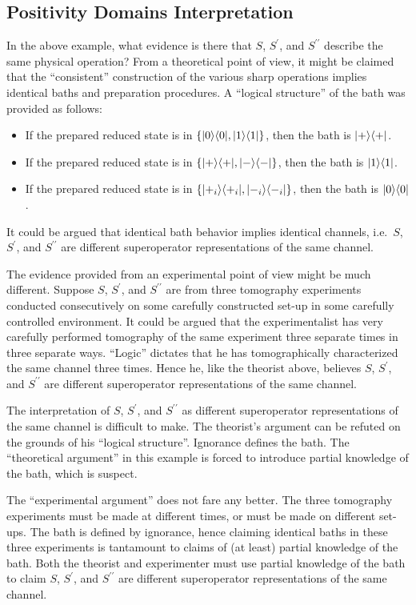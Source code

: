 \subsection{Positivity Domains Interpretation}
In the above example, what evidence is there that $S$, $S^\prime$, and $S^{\prime\prime}$ describe the same physical operation?  From a theoretical point of view, it might be claimed that the ``consistent'' construction of the various sharp operations implies identical baths and preparation procedures.  A ``logical structure'' of the bath was provided as follows:
\begin{itemize}
\item If the prepared reduced state is in $\{|0\rangle\langle0|,|1\rangle\langle1|\}$, then the bath is $|+\rangle\langle+|$.
\item If the prepared reduced state is in $\{|+\rangle\langle+|,|-\rangle\langle-|\}$, then the bath is $|1\rangle\langle1|$.
\item If the prepared reduced state is in $\{|+_i\rangle\langle+_i|,|-_i\rangle\langle-_i|\}$, then the bath is $|0\rangle\langle0|$.
\end{itemize}
It could be argued that identical bath behavior implies identical channels, i.e.\ $S$, $S^\prime$, and $S^{\prime\prime}$ are different superoperator representations of the same channel. 

The evidence provided from an experimental point of view might be much different.  Suppose $S$, $S^\prime$, and $S^{\prime\prime}$ are from three tomography experiments conducted consecutively on some carefully constructed set-up in some carefully controlled environment.  It could be argued that the experimentalist has very carefully performed tomography of the same experiment three separate times in three separate ways.  ``Logic'' dictates that he has tomographically characterized the same channel three times.  Hence he, like the theorist above, believes $S$, $S^\prime$, and $S^{\prime\prime}$ are different superoperator representations of the same channel.

The interpretation of $S$, $S^\prime$, and $S^{\prime\prime}$ as different superoperator representations of the same channel is difficult to make.  The theorist's argument can be refuted on the grounds of his ``logical structure''.  Ignorance defines the bath.  The ``theoretical argument'' in this example is forced to introduce partial knowledge of the bath, which is suspect.

The ``experimental argument'' does not fare any better.  The three tomography experiments must be made at different times, or must be made on different set-ups.  The bath is defined by ignorance, hence claiming identical baths in these three experiments is tantamount to claims of (at least) partial knowledge of the bath.  Both the theorist and experimenter must use partial knowledge of the bath to claim $S$, $S^\prime$, and $S^{\prime\prime}$ are different superoperator representations of the same channel.

